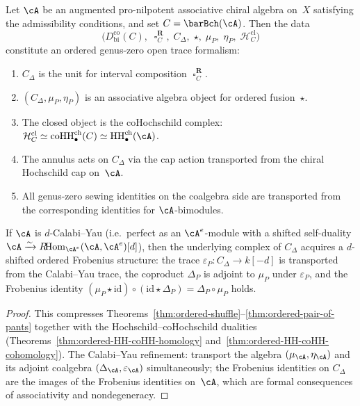 \begin{theorem}
\label{thm:ordered-master}
Let $\cA$ be an augmented pro-nilpotent associative chiral algebra
on~$X$ satisfying the admissibility conditions, and set
$C = \barBch(\cA)$. Then the data
\[
 \bigl(D^{\mathrm{co}}_{\mathrm{bi}}(C),\;
 \mathbin{\square}_C^{\mathbf{R}},\;
 C_\Delta,\;
 \star,\;
 \mu_P,\;
 \eta_P,\;
 \mathcal{H}_C^{\mathrm{cl}}\bigr)
\]
constitute an ordered genus-zero open trace formalism:
\begin{enumerate}
\item $C_\Delta$ is the unit for interval composition
 $\mathbin{\square}_C^{\mathbf{R}}$.
\item $(C_\Delta, \mu_P, \eta_P)$ is an associative algebra object
 for ordered fusion~$\star$.
\item The closed object is the coHochschild complex:
 $\mathcal{H}_C^{\mathrm{cl}} \simeq
 \mathrm{coHH}^{\mathrm{ch}}_\bullet(C) \simeq
 \mathrm{HH}^{\mathrm{ch}}_\bullet(\cA)$.
\item The annulus acts on $C_\Delta$ via the cap action transported
 from the chiral Hochschild cap on~$\cA$.
\item All genus-zero sewing identities on the coalgebra side are
 transported from the corresponding identities for
 $\cA$-bimodules.
\end{enumerate}
If $\cA$ is $d$-Calabi--Yau \textup(i.e.\ perfect as an
$\cA^e$-module with a shifted self-duality
$\cA \xrightarrow{\sim} R\!\mathrm{Hom}_{\cA^e}(\cA, \cA^e)[d]$\textup),
then the underlying complex of $C_\Delta$ acquires a $d$-shifted
ordered Frobenius structure: the trace $\varepsilon_P \colon C_\Delta \to
k[-d]$ is transported from the Calabi--Yau trace, the coproduct
$\Delta_P$ is adjoint to $\mu_P$ under $\varepsilon_P$, and the
Frobenius identity $(\mu_P \star \mathrm{id}) \circ
(\mathrm{id} \star \Delta_P) = \Delta_P \circ \mu_P$ holds.
\end{theorem}

\begin{proof}
This compresses
Theorems~\ref{thm:ordered-shuffle}--\ref{thm:ordered-pair-of-pants}
together with the Hochschild--coHochschild dualities
(Theorems~\ref{thm:ordered-HH-coHH-homology}
and~\ref{thm:ordered-HH-coHH-cohomology}). The Calabi--Yau
refinement: transport the algebra $(\mu_\cA, \eta_\cA)$ and its
adjoint coalgebra $(\Delta_\cA, \varepsilon_\cA)$ simultaneously;
the Frobenius identities on $C_\Delta$ are the images of the
Frobenius identities on~$\cA$, which are formal consequences of
associativity and nondegeneracy.
\end{proof}

